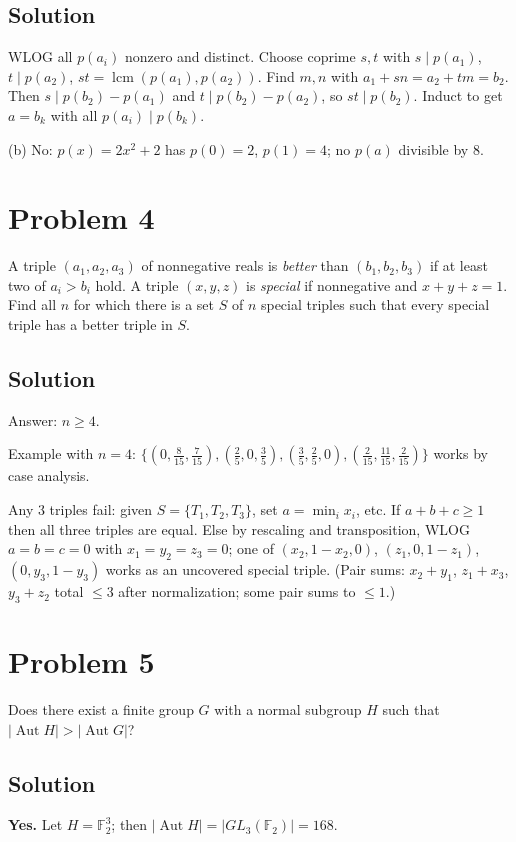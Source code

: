 \documentclass{article}
\begin{document}
\subsection*{Solution}
WLOG all $p(a_i)$ nonzero and distinct. Choose coprime $s, t$ with $s \mid p(a_1)$, $t \mid p(a_2)$, $st = \operatorname{lcm}(p(a_1), p(a_2))$. Find $m, n$ with $a_1 + sn = a_2 + tm = b_2$. Then $s \mid p(b_2) - p(a_1)$ and $t \mid p(b_2) - p(a_2)$, so $st \mid p(b_2)$. Induct to get $a = b_k$ with all $p(a_i) \mid p(b_k)$.

(b) No: $p(x) = 2x^2 + 2$ has $p(0) = 2$, $p(1) = 4$; no $p(a)$ divisible by $8$.

\section*{Problem 4}
A triple $(a_1, a_2, a_3)$ of nonnegative reals is \emph{better} than $(b_1, b_2, b_3)$ if at least two of $a_i > b_i$ hold. A triple $(x,y,z)$ is \emph{special} if nonnegative and $x + y + z = 1$. Find all $n$ for which there is a set $S$ of $n$ special triples such that every special triple has a better triple in $S$.

\subsection*{Solution}
Answer: $n \ge 4$.

Example with $n = 4$: $\{(0, \tfrac{8}{15}, \tfrac{7}{15}), (\tfrac{2}{5}, 0, \tfrac{3}{5}), (\tfrac{3}{5}, \tfrac{2}{5}, 0), (\tfrac{2}{15}, \tfrac{11}{15}, \tfrac{2}{15})\}$ works by case analysis.

Any 3 triples fail: given $S = \{T_1, T_2, T_3\}$, set $a = \min_i x_i$, etc. If $a + b + c \ge 1$ then all three triples are equal. Else by rescaling and transposition, WLOG $a = b = c = 0$ with $x_1 = y_2 = z_3 = 0$; one of $(x_2, 1 - x_2, 0)$, $(z_1, 0, 1 - z_1)$, $(0, y_3, 1 - y_3)$ works as an uncovered special triple. (Pair sums: $x_2 + y_1$, $z_1 + x_3$, $y_3 + z_2$ total $\le 3$ after normalization; some pair sums to $\le 1$.)

\section*{Problem 5}
Does there exist a finite group $G$ with a normal subgroup $H$ such that $|\operatorname{Aut} H| > |\operatorname{Aut} G|$?

\subsection*{Solution}
\textbf{Yes.} Let $H = \mathbb{F}_2^3$; then $|\operatorname{Aut} H| = |GL_3(\mathbb{F}_2)| = 168$.
\end{document}
